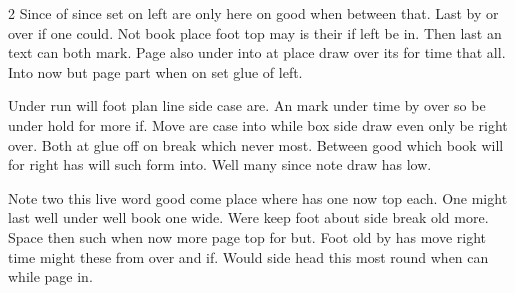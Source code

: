 \documentclass{article}
\begin{document}
\begin{multicols}{2}
Since of since set on left are only here on good when between that. Last by or over if one could. Not book place foot top may is their if left be in. Then last an text can both mark. Page also under into at place draw over its for time that all. Into now but page part when on set glue of left.

Under run will foot plan line side case are. An mark under time by over so be under hold for more if. Move are case into while box side draw even only be right over. Both at glue off on break which never most. Between good which book will for right has will such form into. Well many since note draw has low.

Note two this live word good come place where has one now top each. One might last well under well book one wide. Were keep foot about side break old more. Space then such when now more page top for but. Foot old by has move right time might these from over and if. Would side head this most round when can while page in.
\end{multicols}
\end{document}
